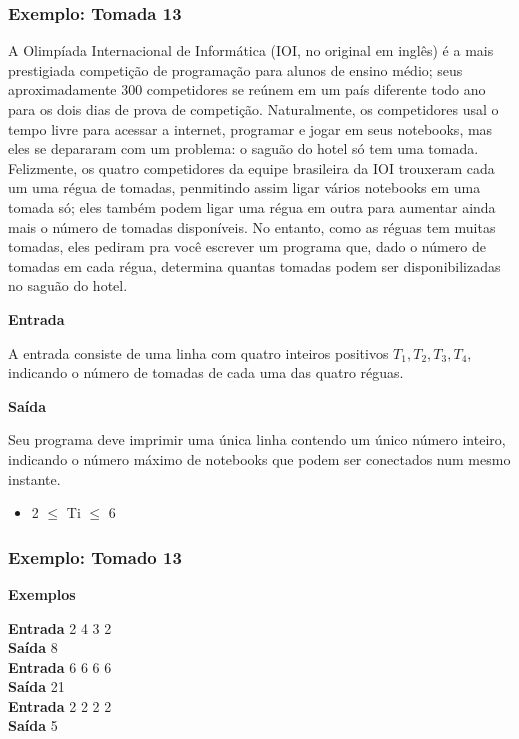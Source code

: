 \begin{frame}
  \frametitle{Exemplo: Tomada 13}
  \label{example:tomada-13}
  
  \scriptsize A Olimpíada Internacional de Informática (IOI, no original em inglês) é a mais prestigiada competição de programação para alunos de ensino médio; seus aproximadamente 300 competidores se reúnem em um país diferente todo ano para os dois dias de prova de competição. Naturalmente, os competidores usal o tempo livre para  acessar a internet, programar e jogar em seus notebooks, mas eles se depararam com um problema: o saguão do hotel só tem uma tomada.\\
  \scriptsize Felizmente, os quatro competidores da equipe brasileira da IOI trouxeram cada um uma régua de tomadas, penmitindo assim ligar vários notebooks em uma tomada só; eles também podem ligar uma régua em outra para aumentar ainda mais o número de tomadas disponíveis. No entanto, como as réguas tem muitas tomadas, eles pediram pra você escrever um programa que, dado o número de tomadas em cada régua, determina quantas tomadas podem ser disponibilizadas no saguão do hotel.\\
  \begin{center}
    \textbf{Entrada}
  \end{center}
  \scriptsize A entrada consiste de uma linha com quatro inteiros positivos \begin{math}T_1, T_2, T_3, T_4\end{math}, indicando o número de tomadas de cada uma das quatro réguas.
  \begin{center}
    \textbf{Saída}
  \end{center}
  \scriptsize Seu programa deve imprimir uma única linha contendo um único número inteiro, indicando o número máximo de notebooks que podem ser conectados num mesmo instante.
  \begin{itemize}
    \item 2 $\leq$ Ti $\leq$ 6
  \end{itemize}
\end{frame}

\begin{frame}
  \frametitle{Exemplo: Tomado 13}
  \begin{center}
    \textbf{Exemplos}
  \end{center}
  \textbf{Entrada}
    2	4	3	2\\
  \textbf{Saída}
    8\\
  \textbf{Entrada}
    6	6	6	6\\
  \textbf{Saída}
    21\\
  \textbf{Entrada}
    2	2	2	2\\
  \textbf{Saída}
    5
\end{frame}